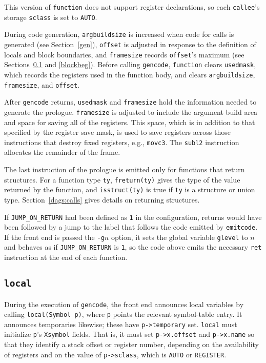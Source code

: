 This version of \verb|function| does not support register
declarations, so each \verb|callee|'s storage \verb|sclass| is
set to \verb|AUTO|.

During code generation, \verb|argbuildsize| is increased when
code for calls is generated (see Section~\ref{gen}), \verb|offset| is adjusted in response
to the definition of locals and block boundaries,
and \verb|framesize| records \verb|offset|'s maximum
(see Sections~\ref{local} and \ref{blockbeg}).
Before calling \verb|gencode|, \verb|function| clears
\verb|usedmask|, which records the registers used in the function body,
and clears \verb|argbuildsize|, \verb|framesize|, and \verb|offset|.

After \verb|gencode| returns, \verb|usedmask| and \verb|framesize|
hold the information needed to generate the prologue.
\verb|framesize| is adjusted to include the argument build area
and space for saving all of the registers.
This space, which is in addition to that specified by the register save mask,
is used to save registers across those instructions that
destroy fixed registers, e.g., \verb|movc3|.
The \verb|subl2| instruction allocates the remainder of the frame.

The last instruction of the prologue is emitted only for
functions that return structures. For a function type \verb|ty|,
\verb|freturn(ty)| gives the type of the value returned by the function,
and \verb|isstruct(ty)| is true if \verb|ty| is a structure or union type.
Section~\ref{dags:calls} gives details on returning structures.

If \verb|JUMP_ON_RETURN| had been defined as \verb|1| in the configuration,
returns would have been followed by a jump to the label
that follows the code emitted by \verb|emitcode|. If the front
end is passed the \verb|-g|$n$ option, it sets the global
variable \verb|glevel| to $n$
and behaves as if \verb|JUMP_ON_RETURN| is \verb|1|, so the code
above emits the necessary \verb|ret| instruction at the end
of each function.

\subsection{\tt local}

\label{local}

During the execution of \verb|gencode|, the front end announces local
variables by calling \verb|local(Symbol p)|, where \verb|p| points the
relevant symbol-table entry.  It announces temporaries likewise; these
have \verb|p->temporary| set. \verb|local| must initialize \verb|p|'s
\verb|Xsymbol| fields. That is, it must set \verb|p->x.offset| and \verb|p->x.name|
so that they identify a
stack offset or register number, depending on the availability of
registers and on the value of \verb|p->sclass|, which is \verb|AUTO| or
\verb|REGISTER|.

